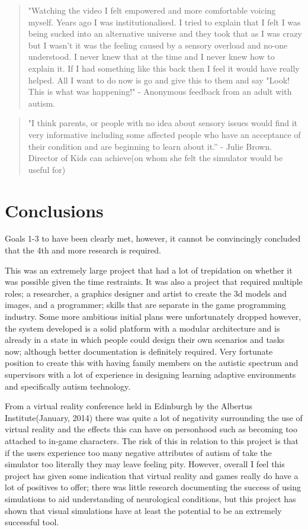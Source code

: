 \documentclass[11pt]{report}
\begin{document}
\begin{quote}
"Watching the video I felt empowered and more comfortable voicing myself. Years ago I was institutionalised. I tried to explain that I felt I was being sucked into an alternative universe and they took that as I was crazy but I wasn't it was the feeling caused by a sensory overload and no-one understood. I never knew that at the time and I never knew how to explain it. If I had something like this back then I feel it would have really helped. All I want to do now is go and give this to them and say "Look! This is what was happening!" - Anonymous feedback from an adult with autism.
\end{quote}

\begin{quote}
"I think parents, or people with no idea about sensory issues would find it very informative including some affected people who have an acceptance of their condition and are beginning to learn about it.” - Julie Brown. Director of Kids can achieve(on whom she felt the simulator would be useful for) 
\end{quote}

\section{Conclusions}
Goals 1-3 to have been clearly met, however, it cannot be convincingly concluded that the 4th and more research is required. 

This was an extremely large project that had a lot of trepidation on whether it was possible given the time restraints. It was also a project that required multiple roles; a researcher, a graphics designer and artist to create the 3d models and images, and a programmer; skills that are separate in the game programming industry. Some more ambitious initial plans were unfortunately dropped however, the system developed is a solid platform with a modular architecture and is already in a state in which people could design their own scenarios and tasks now; although better documentation is definitely required. Very fortunate position to create this with having family members on the autistic spectrum and supervisors with a lot of experience in designing learning adaptive environments and specifically autism technology.

From a virtual reality conference held in Edinburgh by the Albertus Institute(January, 2014) there was quite a lot of negativity surrounding the use of virtual reality and the effects this can have on personhood such as becoming too attached to in-game characters. The risk of this in relation to this project is that if the users experience too many negative attributes of autism of take the simulator too literally they may leave feeling pity. However, overall I feel this project has given some indication that virtual reality and games really do have a lot of positives to offer; there was little research documenting the success of using simulations to aid understanding of neurological conditions, but this project has shown that visual simulations have at least the potential to be an extremely successful tool.

\begin{appendices}

\end{appendices}
\end{document}
